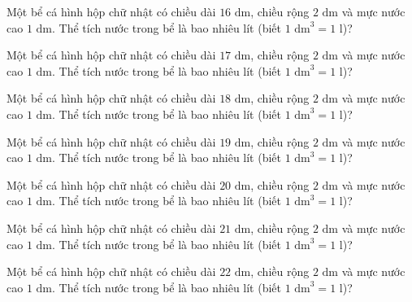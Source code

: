 \begin{ex}
  Một bể cá hình hộp chữ nhật có chiều dài $16\text{ dm}$, chiều rộng $2\text{ dm}$ và mực nước cao $1\text{ dm}$. Thể tích nước trong bể là bao nhiêu lít (biết $1\text{ dm}^3 = 1\text{ l}$)?
\end{ex}

\begin{ex}
  Một bể cá hình hộp chữ nhật có chiều dài $17\text{ dm}$, chiều rộng $2\text{ dm}$ và mực nước cao $1\text{ dm}$. Thể tích nước trong bể là bao nhiêu lít (biết $1\text{ dm}^3 = 1\text{ l}$)?
\end{ex}

\begin{ex}
  Một bể cá hình hộp chữ nhật có chiều dài $18\text{ dm}$, chiều rộng $2\text{ dm}$ và mực nước cao $1\text{ dm}$. Thể tích nước trong bể là bao nhiêu lít (biết $1\text{ dm}^3 = 1\text{ l}$)?
\end{ex}

\begin{ex}
  Một bể cá hình hộp chữ nhật có chiều dài $19\text{ dm}$, chiều rộng $2\text{ dm}$ và mực nước cao $1\text{ dm}$. Thể tích nước trong bể là bao nhiêu lít (biết $1\text{ dm}^3 = 1\text{ l}$)?
\end{ex}

\begin{ex}
  Một bể cá hình hộp chữ nhật có chiều dài $20\text{ dm}$, chiều rộng $2\text{ dm}$ và mực nước cao $1\text{ dm}$. Thể tích nước trong bể là bao nhiêu lít (biết $1\text{ dm}^3 = 1\text{ l}$)?
\end{ex}

\begin{ex}
  Một bể cá hình hộp chữ nhật có chiều dài $21\text{ dm}$, chiều rộng $2\text{ dm}$ và mực nước cao $1\text{ dm}$. Thể tích nước trong bể là bao nhiêu lít (biết $1\text{ dm}^3 = 1\text{ l}$)?
\end{ex}

\begin{ex}
  Một bể cá hình hộp chữ nhật có chiều dài $22\text{ dm}$, chiều rộng $2\text{ dm}$ và mực nước cao $1\text{ dm}$. Thể tích nước trong bể là bao nhiêu lít (biết $1\text{ dm}^3 = 1\text{ l}$)?
\end{ex}

